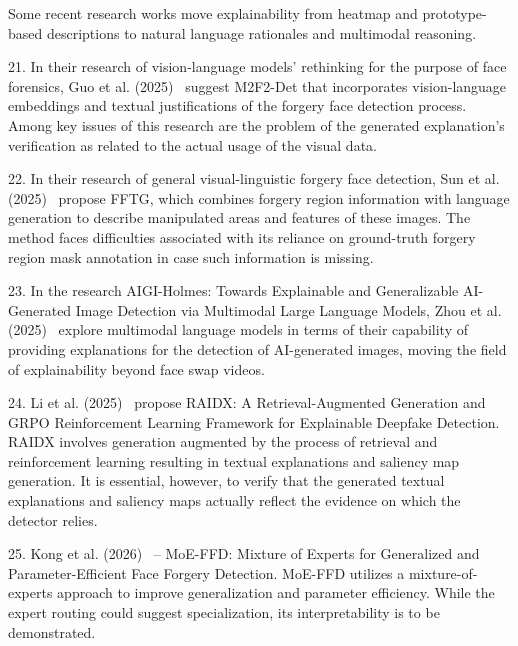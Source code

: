\documentclass[12pt,a4wide]{report}
\theoremstyle{plain}
\theoremstyle{definition}
\theoremstyle{remark}
\begin{document}
Some recent research works move explainability from heatmap and prototype-based descriptions to natural language rationales and multimodal reasoning.

\begin{description}
     
  \item 21. In their research of vision-language models' rethinking for the purpose of face forensics, Guo et al. (2025)~\cite{guo2025m2f2det} suggest M2F2-Det that incorporates vision-language embeddings and textual justifications of the forgery face detection process. Among key issues of this research are the problem of the generated explanation's verification as related to the actual usage of the visual data.
  
  \item 22. In their research of general visual-linguistic forgery face detection, Sun et al. (2025)~\cite{sun2025fftg} propose FFTG, which combines forgery region information with language generation to describe manipulated areas and features of these images. The method faces difficulties associated with its reliance on ground-truth forgery region mask annotation in case such information is missing.

  \item 23. In the research AIGI-Holmes: Towards Explainable and Generalizable AI-Generated Image Detection via Multimodal Large Language Models, Zhou et al. (2025)~\cite{zhou2025aigiholmes} explore multimodal language models in terms of their capability of providing explanations for the detection of AI-generated images, moving the field of explainability beyond face swap videos.

  \item 24. Li et al. (2025)~\cite{li2025raidx} propose RAIDX: A Retrieval-Augmented Generation and GRPO Reinforcement Learning Framework for Explainable Deepfake Detection. RAIDX involves generation augmented by the process of retrieval and reinforcement learning resulting in textual explanations and saliency map generation. It is essential, however, to verify that the generated textual explanations and saliency maps actually reflect the evidence on which the detector relies.

 \item 25. Kong et al. (2026)~\cite{kong2026moeffd} – MoE-FFD: Mixture of Experts for Generalized and Parameter-Efficient Face Forgery Detection. MoE-FFD utilizes a mixture-of-experts approach to improve generalization and parameter efficiency. While the expert routing could suggest specialization, its interpretability is to be demonstrated.

        
\end{description}
\end{document}
